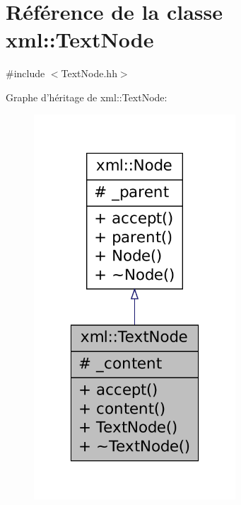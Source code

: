 \hypertarget{classxml_1_1_text_node}{
\section{Référence de la classe xml::TextNode}
\label{classxml_1_1_text_node}
}


{\ttfamily \#include $<$TextNode.hh$>$}



Graphe d'héritage de xml::TextNode:\nopagebreak
\begin{figure}[H]
\begin{center}
\leavevmode
\includegraphics[width=214pt]{classxml_1_1_text_node__inherit__graph}
\end{center}
\end{figure}


